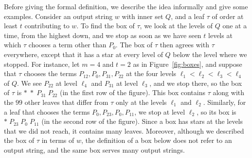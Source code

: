 Before giving the formal definition, we describe the idea informally and give some examples. Consider an output string $w$ with inner set $Q$, and a leaf $\tau$ of order at least $t$ contributing to $w$. To find the box of $\tau$, we look at the levels of $Q$ one at a time, from the highest down, and we stop as soon as we have seen $t$ levels at which $\tau$ chooses a term other than $P_0$. The box of $\tau$ then agrees with $\tau$ everywhere, except that it has a star at every level of $Q$ below the level where we stopped. For instance, let $m=4$ and $t=2$ as in Figure~\ref{fig:boxes}, and suppose that $\tau$ chooses the terms $P_{12},P_0,P_{31},P_{22}$ at the four levels $\ell_1<\ell_2<\ell_3<\ell_4$ of $Q$. We see $P_{22}$ at level $\ell_4$ and $P_{31}$ at level $\ell_3$, and we stop there, so the box of $\tau$ is $\ast\;\ast\;P_{31}\;P_{22}$ (in the first row of the figure). This box contains $\tau$ along with the $99$ other leaves that differ from $\tau$ only at the levels $\ell_1$ and $\ell_2$. Similarly, for a leaf that chooses the terms $P_0,P_{23},P_0,P_{11}$, we stop at level $\ell_2$, so its box is $\ast\;P_{23}\;P_0\;P_{11}$ (in the second row of the figure). Since a box has stars at the levels that we did not reach, it contains many leaves. Moreover, although we described the box of $\tau$ in terms of $w$, the definition of a box below does not refer to an output string, and the same box serves many output strings.


